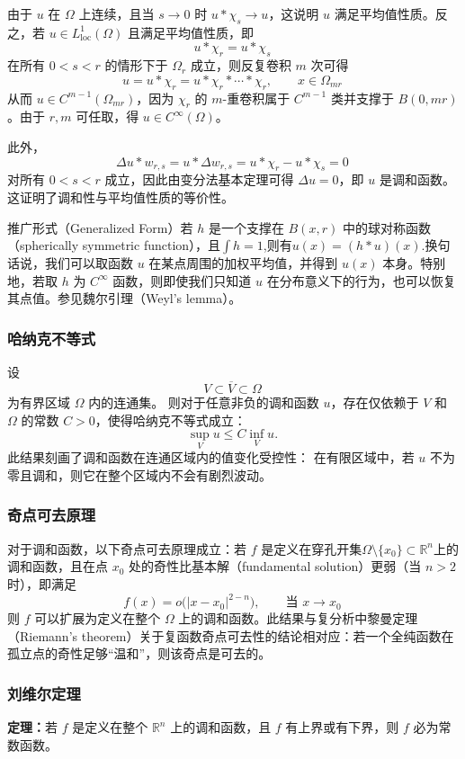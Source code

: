 由于 \(u\) 在 \(\Omega\) 上连续，且当 \(s \to 0\) 时 \(u * \chi_s \to u\)，这说明 \(u\) 满足平均值性质。反之，若 \(u \in L^1_{\mathrm{loc}}(\Omega)\) 且满足平均值性质，即
\[
u * \chi_r = u * \chi_s~
\]
在所有 \(0 < s < r\) 的情形下于 \(\Omega_r\) 成立，则反复卷积 \(m\) 次可得
\[
u = u * \chi_r = u * \chi_r * \cdots * \chi_r, \qquad x \in \Omega_{mr}~
\]
从而 \(u \in C^{m-1}(\Omega_{mr})\)，因为 \(\chi_r\) 的 \(m\)-重卷积属于 \(C^{m-1}\) 类并支撑于 \(B(0,mr)\)。由于 \(r,m\) 可任取，得 \(u \in C^{\infty}(\Omega)\)。

此外，
\[
\Delta u * w_{r,s} = u * \Delta w_{r,s} = u * \chi_r - u * \chi_s = 0~
\]
对所有 \(0 < s < r\) 成立，因此由变分法基本定理可得 \(\Delta u = 0\)，即 \(u\) 是调和函数。这证明了调和性与平均值性质的等价性。

推广形式（Generalized Form）若 \(h\) 是一个支撑在 \(B(x, r)\) 中的球对称函数（spherically symmetric function），且\(\int h = 1\),则有\(u(x) = (h * u)(x)\).换句话说，我们可以取函数 \(u\) 在某点周围的加权平均值，并得到 \(u(x)\) 本身。特别地，若取 \(h\) 为 \(C^{\infty}\) 函数，则即使我们只知道 \(u\) 在分布意义下的行为，也可以恢复其点值。参见魏尔引理（Weyl’s lemma）。
\subsubsection{哈纳克不等式}
设
\[
V \subset \overline{V} \subset \Omega~
\]
为有界区域 \(\Omega\) 内的连通集。  
则对于任意非负的调和函数 \(u\)，存在仅依赖于 \(V\) 和 \(\Omega\) 的常数 \(C > 0\)，使得哈纳克不等式成立：
\[
\sup_{V} u \leq C \inf_{V} u.~
\]
此结果刻画了调和函数在连通区域内的值变化受控性：  
在有限区域中，若 \(u\) 不为零且调和，则它在整个区域内不会有剧烈波动。
\subsubsection{奇点可去原理}
对于调和函数，以下奇点可去原理成立：若 \( f \) 是定义在穿孔开集\(\Omega \setminus \{x_0\} \subset \mathbb{R}^n\)上的调和函数，且在点 \(x_0\) 处的奇性比基本解（fundamental solution）更弱（当 \(n > 2\) 时），即满足
\[
f(x) = o\bigl(|x - x_0|^{2 - n}\bigr), \qquad \text{当 } x \to x_0~
\]
则 \(f\) 可以扩展为定义在整个 \(\Omega\) 上的调和函数。此结果与复分析中黎曼定理（Riemann's theorem）关于复函数奇点可去性的结论相对应：若一个全纯函数在孤立点的奇性足够“温和”，则该奇点是可去的。
\subsubsection{刘维尔定理}
\textbf{定理：}若 \( f \) 是定义在整个 \(\mathbb{R}^n\) 上的调和函数，且 \( f \) 有上界或有下界，则 \( f \) 必为常数函数。

